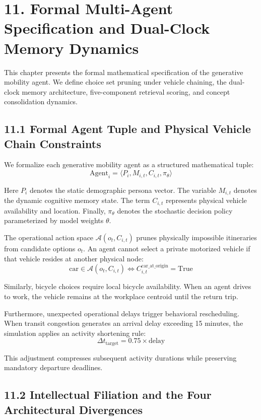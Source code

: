 \section{11. Formal Multi-Agent Specification and Dual-Clock Memory Dynamics}

This chapter presents the formal mathematical specification of the generative mobility agent. We define choice set pruning under vehicle chaining, the dual-clock memory architecture, five-component retrieval scoring, and concept consolidation dynamics.

\subsection{11.1 Formal Agent Tuple and Physical Vehicle Chain Constraints}

We formalize each generative mobility agent as a structured mathematical tuple:
\[\text{Agent}_i = \langle P_i, M_{i,t}, C_{i,t}, \pi_\theta \rangle\]

Here $P_i$ denotes the static demographic persona vector. The variable $M_{i,t}$ denotes the dynamic cognitive memory state. The term $C_{i,t}$ represents physical vehicle availability and location. Finally, $\pi_\theta$ denotes the stochastic decision policy parameterized by model weights $\theta$.

The operational action space $\mathcal{A}(o_t, C_{i,t})$ prunes physically impossible itineraries from candidate options $o_t$. An agent cannot select a private motorized vehicle if that vehicle resides at another physical node:
\[\text{car} \in \mathcal{A}(o_t, C_{i,t}) \iff C_{i,t}^{\text{car\_at\_origin}} = \text{True}\]

Similarly, bicycle choices require local bicycle availability. When an agent drives to work, the vehicle remains at the workplace centroid until the return trip.

Furthermore, unexpected operational delays trigger behavioral rescheduling. When transit congestion generates an arrival delay exceeding 15 minutes, the simulation applies an activity shortening rule:
\[\Delta t_{\text{target}} = 0.75 \times \text{delay}\]

This adjustment compresses subsequent activity durations while preserving mandatory departure deadlines.

\subsection{11.2 Intellectual Filiation and the Four Architectural Divergences}

